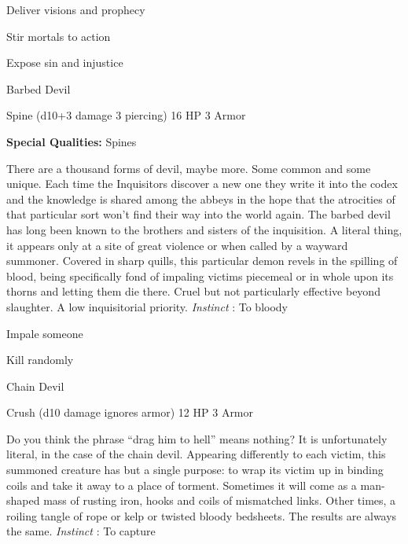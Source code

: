 \startitemize[1,packed]
         
\item Deliver visions and prophecy

         
\item Stir mortals to action

         
\item Expose sin and injustice

       
\stopitemize
       
\startMonsterName
Barbed Devil	 
\stopMonsterName
       

Spine (d10+3 damage 3 piercing)	16 HP	3 Armor

       


       
\startMonsterQualities
         {\bf Special Qualities:}  Spines
\stopMonsterQualities
       
\startMonsterDescription
There are a thousand forms of devil, maybe more. Some common and some unique. Each time the Inquisitors discover a new one they write it into the codex and the knowledge is shared among the abbeys in the hope that the atrocities of that particular sort won’t find their way into the world again. The barbed devil has long been known to the brothers and sisters of the inquisition. A literal thing, it appears only at a site of great violence or when called by a wayward summoner. Covered in sharp quills, this particular demon revels in the spilling of blood, being specifically fond of impaling victims piecemeal or in whole upon its thorns and letting them die there. Cruel but not particularly effective beyond slaughter. A low inquisitorial priority. {\em Instinct} : To bloody
\stopMonsterDescription
       
\startitemize[1,packed]
         
\item Impale someone

         
\item Kill randomly

       
\stopitemize
       
\startMonsterName
Chain Devil	 
\stopMonsterName
       

Crush (d10 damage ignores armor)	12 HP	3 Armor

       


       
\startMonsterDescription
Do you think the phrase “drag him to hell” means nothing? It is unfortunately literal, in the case of the chain devil. Appearing differently to each victim, this summoned creature has but a single purpose: to wrap its victim up in binding coils and take it away to a place of torment. Sometimes it will come as a man-shaped mass of rusting iron, hooks and coils of mismatched links. Other times, a roiling tangle of rope or kelp or twisted bloody bedsheets. The results are always the same. {\em Instinct} : To capture
\stopMonsterDescription
       
